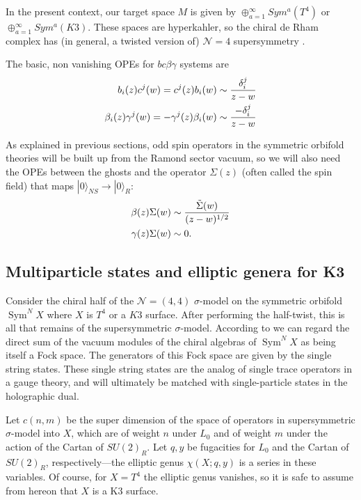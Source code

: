 \documentclass[11pt]{amsart}
\newcommand{\mc}{\mathcal}
\DeclareMathOperator{\Sym}{Sym} \DeclareMathOperator{\Hom}{Hom}
\theoremstyle{thm}
\numberwithin{equation}{subsection}
\theoremstyle{def}
\theoremstyle{rem}
\begin{document}
In the present context, our target space $M$ is given by $\oplus_{a=1}^{\infty} Sym^a (T^4)$ or $\oplus_{a=1}^{\infty} Sym^a(K3)$. These spaces are hyperkahler, so the chiral de Rham complex has  (in general, a twisted version of) $\mathcal{N}=4$ supersymmetry \cite{Heluanietal}.

The basic, non vanishing OPEs for $bc\beta\gamma$ systems are
\begin{align*}
b_i(z)c^j(w) = c^j(z)b_i(w) &\sim {\delta^{j}_i \over z - w} \\
\beta_i(z)\gamma^j(w) = -\gamma^j(z)\beta_i(w) &\sim {-\delta^{j}_i \over z - w}
\end{align*}

As explained in previous sections, odd spin operators in the symmetric orbifold theories will be built up from the Ramond sector vacuum, so we will also need the OPEs between the ghosts and the operator $\Sigma(z)$ (often called the spin field) that maps $|0\rangle_{NS} \rightarrow |0\rangle_{R}$:
\begin{align*}
\beta(z)\Sigma(w) &\sim {\tilde{\Sigma}(w) \over (z - w)^{1/2}}\\
\gamma(z)\Sigma(w) &\sim 0.
\end{align*}

\subsection{Multiparticle states and elliptic genera for K3}


Consider the chiral half of the $\mc N= (4,4)$ $\sigma$-model on the symmetric orbifold  $\Sym^N X$ where $X$ is $T^4$ or a $K3$ surface. 
After performing the half-twist, this is all that remains of the supersymmetric $\sigma$-model.
 According to \cite{DMVV} we can regard the direct sum of the vacuum modules of the chiral algebras of $\Sym^N X$ as being itself a Fock space. The generators of this Fock space are given by the single string states. These single string states are the analog of single trace operators in a gauge theory, and will ultimately be matched with single-particle states in the holographic dual.

Let $c(n,m)$ be the super dimension of the space of operators in supersymmetric $\sigma$-model into $X$, which are of weight $n$ under $L_0$ and of weight $m$ under the action of the Cartan of $SU(2)_R$.  
Let $q,y$ be fugacities for $L_0$ and the Cartan of $SU(2)_R$, respectively---the elliptic genus $\chi(X;q,y)$ is a series in these variables.  
Of course, for $X = T^4$ the elliptic genus vanishes, so it is safe to assume from hereon that $X$ is a K3 surface.
\end{document}
